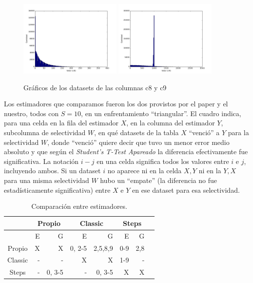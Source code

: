  
\begin{figure}[h!]
  \centering
  \includegraphics[width=0.45\textwidth]{./../source/datasets/img/c8}
  \includegraphics[width=0.45\textwidth]{./../source/datasets/img/c9}
  \caption{Gráficos de los datasets de las columnas c8 y c9}
 \end{figure}
 
\clearpage
Los estimadores que comparamos fueron los dos provistos por el paper y el nuestro, todos con $S=10$, en un enfrentamiento ``triangular''.
El cuadro indica, para una celda en la fila del estimador $X$, en la columna del estimador $Y$, subcolumna de selectividad $W$, en qué datasets de la tabla $X$ ``venció'' a $Y$ para la selectividad $W$, donde ``venció'' quiere decir que tuvo un menor error medio absoluto y que según el \textit{Student’s T-Test Apareado} la diferencia efectivamente fue significativa. La notación $i-j$ en una celda significa todos los valores entre $i$ e $j$, incluyendo ambos. Si un dataset $i$ no aparece ni en la celda $X, Y$ ni en la $Y, X$ para una misma selectividad $W$ hubo un ``empate'' (la diferencia no fue estadísticamente significativa) entre $X$ e $Y$ en ese dataset para esa selectividad.

\begin{table}[h!t]
\centering %
\begin{tabular}{c rrrrrrr} %
\hline\hline %
\ &\multicolumn{2}{c}{Propio}& \multicolumn{2}{c}{Classic}& \multicolumn{2}{c}{Steps} \\ [0.5ex] 
\hline %
 & E & G & E & G & E & G &  \\  
\hline
Propio &X  &X  &0, 2-5&2,5,8,9&0-9 &2,8 \\ %
\hline
Classic &-  &-  &X &X &1-9 &- \\
\hline
Steps &-  &0, 3-5 &- &0, 3-5 &X &X  \\[1ex] %
\hline %
\end{tabular}
\caption{Comparación entre estimadores.} %
\label{tab:hresult}
\end{table}

